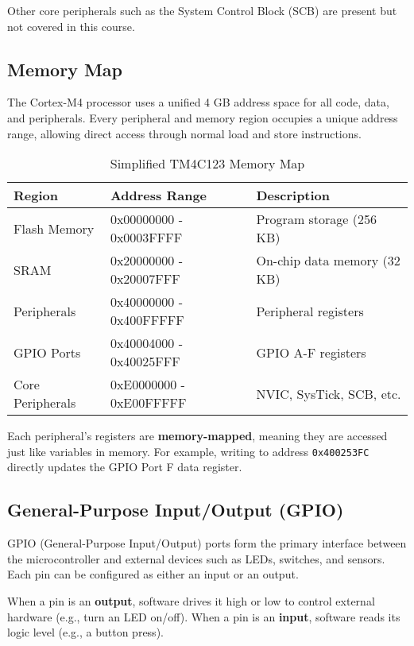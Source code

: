 \noindent Other core peripherals such as the System Control Block (SCB) are present but not covered in this course.
\bigskip

\subsection{Memory Map}

The Cortex-M4 processor uses a unified 4 GB address space for all code, data, and peripherals.  
Every peripheral and memory region occupies a unique address range, allowing direct access through normal load and store instructions.

\begin{table}[H]
\centering
\small
\begin{tabular}{lll}
\toprule
\textbf{Region} & \textbf{Address Range} & \textbf{Description} \\
\midrule
Flash Memory & 0x00000000 - 0x0003FFFF & Program storage (256 KB) \\
SRAM & 0x20000000 - 0x20007FFF & On-chip data memory (32 KB) \\
Peripherals & 0x40000000 - 0x400FFFFF & Peripheral registers \\
GPIO Ports & 0x40004000 - 0x40025FFF & GPIO A-F registers \\
Core Peripherals & 0xE0000000 - 0xE00FFFFF & NVIC, SysTick, SCB, etc. \\
\bottomrule
\end{tabular}
\caption{Simplified TM4C123 Memory Map}
\end{table}

\noindent
Each peripheral's registers are \textbf{memory-mapped}, meaning they are accessed just like variables in memory.  
For example, writing to address \texttt{0x400253FC} directly updates the GPIO Port F data register.


\subsection{General-Purpose Input/Output (GPIO)}

GPIO (General-Purpose Input/Output) ports form the primary interface between the microcontroller and external devices such as LEDs, switches, and sensors. Each pin can be configured as either an input or an output.

When a pin is an \textbf{output}, software drives it high or low to control external hardware (e.g., turn an LED on/off).  
When a pin is an \textbf{input}, software reads its logic level (e.g., a button press).

